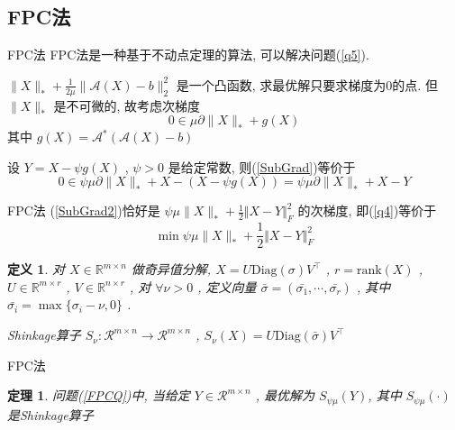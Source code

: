 \documentclass[slidestop, compress, mathserif, UTF8]{beamer}
\newtheorem{theo}{\bf \textcolor[rgb]{0.8,0,0}{定理}}[section]          %
\newtheorem{define}{\bf \textcolor[rgb]{0.8,0,0}{定义}}[section]
\numberwithin{equation}{section}                                        %
\begin{document}
        \subsection{FPC法}        
            \begin{frame}[t]{FPC法}
                FPC法是一种基于不动点定理的算法, 可以解决问题(\ref{q5}).

                $\lVert{X}\rVert_*+\frac{1}{2\mu}\lVert{\mathcal{A}(X)-b}\rVert_2^2$ 是一个凸函数, 求最优解只要求梯度为0的点. 但 $\lVert{X}\rVert_*$ 是不可微的, 故考虑次梯度
                \begin{equation}\label{SubGrad}
                    0 \in \mu \partial \lVert{X}\rVert_* + g(X)
                \end{equation}
                \small{其中 $g(X) = \mathcal{A}^*(\mathcal{A}(X) - b)$}\normalsize

                设 $Y = X - \psi g(X)$ , $\psi > 0$ 是给定常数, 则(\ref{SubGrad})等价于
                \begin{equation}\label{SubGrad2}
                    0 \in \psi \mu \partial \lVert{X}\rVert_* + X - (X - \psi g(X)) = \psi \mu \partial \lVert{X}\rVert_* + X -Y
                \end{equation}
            \end{frame}
            \begin{frame}[t]{FPC法}
                (\ref{SubGrad2})恰好是 $\psi \mu \lVert{X}\rVert_* + \frac{1}{2} \Vert{X - Y}\Vert^2_F$ 的次梯度, 即(\ref{q4})等价于 
                \begin{equation}\label{FPCQ}
                    \min \psi \mu \lVert{X}\rVert_* + \frac{1}{2} \Vert{X - Y}\Vert^2_F
                \end{equation}

                \begin{define}
                    对 $X \in \mathbb{R}^{m \times n}$ 做奇异值分解, $X = U \text{Diag}(\sigma) V ^\top$ , $r = \text{rank}(X)$ , $U \in \mathbb{R}^{m \times r}$ , $V \in \mathbb{R}^{n \times r}$ , 对 $\forall \nu > 0$ , 定义向量 $\bar{\sigma} = (\bar{\sigma_1}, \cdots, \bar{\sigma_r})$ , 其中$\bar{\sigma_i} = \max \{\sigma_i - \nu, 0\}$ .
                    
                    Shinkage算子 $S_\nu: \mathcal{R}^{m \times n} \rightarrow \mathcal{R}^{m \times n}$ , $S_\nu(X) = U \text{Diag}(\bar{\sigma}) V ^\top$
                \end{define}
            \end{frame}
            \begin{frame}[t]{FPC法}
                \begin{theo}
                    问题(\ref{FPCQ})中, 当给定 $Y \in \mathcal{R}^{m \times n}$ , 最优解为 $S_{\psi \mu}(Y)$, 其中 $S_{\psi \mu}(\cdot)$ 是Shinkage算子
                \end{theo}
            \end{frame}
\end{document}
